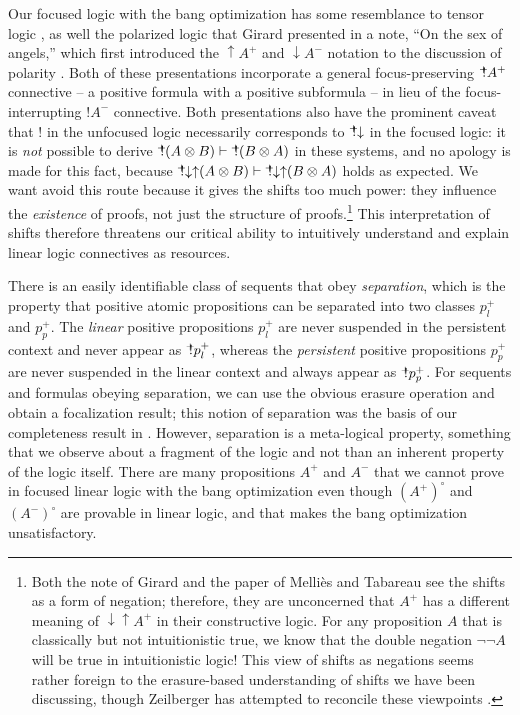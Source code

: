 Our focused logic with the bang optimization has some resemblance to
tensor logic \cite{mellies10resource}, as well the polarized logic
that Girard presented in a note, ``On the sex of angels,'' which first
introduced the ${\uparrow}A^+$ and ${\downarrow}A^-$ notation to the
discussion of polarity \cite{girard91sex}. Both of these presentations
incorporate a general focus-preserving ${\mbox{\hspace{2pt}$\mathbb !$\hspace{-5pt}$^+$\hspace{-1pt}}}A^+$ connective -- a
positive formula with a positive subformula -- in lieu of the
focus-interrupting ${!}A^-$ connective.  Both presentations also have
the prominent caveat that ${!}$ in the unfocused logic necessarily
corresponds to ${\mbox{\hspace{2pt}$\mathbb !$\hspace{-5pt}$^+$\hspace{-1pt}}}{\downarrow}$ in the focused logic: it is {\it
  not} possible to derive ${\mbox{\hspace{2pt}$\mathbb !$\hspace{-5pt}$^+$\hspace{-1pt}}}(A \otimes B) \vdash {\mbox{\hspace{2pt}$\mathbb !$\hspace{-5pt}$^+$\hspace{-1pt}}}(B
\otimes A)$ in these systems, and no apology is made for this fact,
because ${\mbox{\hspace{2pt}$\mathbb !$\hspace{-5pt}$^+$\hspace{-1pt}}}{\downarrow}{\uparrow}(A \otimes B) \vdash
{\mbox{\hspace{2pt}$\mathbb !$\hspace{-5pt}$^+$\hspace{-1pt}}}{\downarrow}{\uparrow}(B \otimes A)$ holds as expected.  We
want avoid this route because it gives the shifts too much power: they
influence the {\it existence} of proofs, not just the structure of
proofs.\footnote{Both the note of Girard and the paper of Melli{\`e}s
  and Tabareau see the shifts as a form of negation; therefore, they
  are unconcerned that $A^+$ has a different meaning of
  ${\downarrow}{\uparrow}A^+$ in their constructive logic. For any
  proposition $A$ that is classically but not intuitionistic true, we
  know that the double negation $\neg\neg A$ will be true in
  intuitionistic logic! This view of shifts as negations seems rather
  foreign to the erasure-based understanding of shifts we have been
  discussing, though Zeilberger has attempted to reconcile these
  viewpoints \cite{zeilberger08unity}.} This interpretation of shifts
therefore threatens our critical ability to intuitively understand and
explain linear logic connectives as resources.

There is an easily identifiable class of sequents that obey {\it
  separation}, which is the property that positive atomic propositions
can be separated into two classes $p^+_l$ and $p^+_p$. The {\it
  linear} positive propositions $p^+_l$ are never suspended in the
persistent context and never appear as ${\mbox{\hspace{2pt}$\mathbb !$\hspace{-5pt}$^+$\hspace{-1pt}}}p^+_l$, whereas the
{\it persistent} positive propositions $p^+_p$ are never suspended in
the linear context and always appear as ${\mbox{\hspace{2pt}$\mathbb !$\hspace{-5pt}$^+$\hspace{-1pt}}}p^+_p$. For sequents
and formulas obeying separation, we can use the obvious erasure
operation and obtain a focalization result; this notion of separation
was the basis of our completeness result in
\cite{pfenning09substructural}.  However, separation is a meta-logical
property, something that we observe about a fragment of the logic and
not than an inherent property of the logic itself. There are many
propositions $A^+$ and $A^-$ that we cannot prove in focused linear
logic with the bang optimization even though $(A^+)^\circ$ and
$(A^-)^\circ$ are provable in linear logic, and that makes the bang
optimization unsatisfactory.

